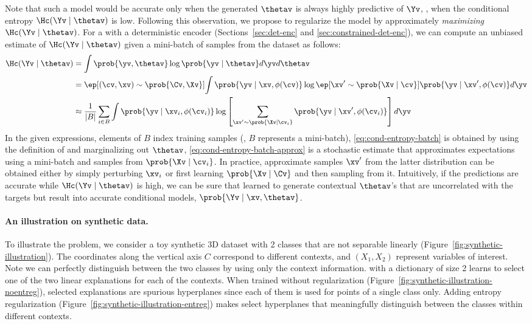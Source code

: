 \documentclass[twoside,11pt]{article}
\begin{document}
Note that such a model would be accurate only when the generated $\thetav$ is always highly predictive of $\Yv$, \ie, when the conditional entropy $\Hc(\Yv \mid \thetav)$ is low.
Following this observation, we propose to regularize the model by approximately \emph{maximizing} $\Hc(\Yv \mid \thetav)$.
For a {\CEN} with a deterministic encoder (Sections~\ref{sec:det-enc} and \ref{sec:constrained-det-enc}), we can compute an unbiased estimate of $\Hc(\Yv \mid \thetav)$ given a mini-batch of samples from the dataset as follows:
\begin{align}
    \label{eq:cond-ent-reg}
    \Hc(\Yv \mid \thetav)
    & = \int \prob{\yv, \thetav} \log \prob{\yv \mid \thetav} d\yv d\thetav \\
    & = \ep[(\cv, \xv) \sim \prob{\Cv, \Xv}]{\int \prob{\yv \mid \xv, \phi(\cv)} \log \ep[\xv^\prime \sim \prob{\Xv \mid \cv}]{\prob{\yv \mid \xv^\prime, \phi(\cv)}} d\yv} \label{eq:cond-entropy-batch} \\
    & \approx \frac{1}{|B|} \sum_{i \in B} \int \prob{\yv \mid \xv_i, \phi(\cv_i)} \log \left[\sum_{\xv^\prime \sim \prob{\Xv \mid \cv_i}} \prob{\yv \mid \xv^\prime, \phi(\cv_i)}\right] d\yv \label{eq:cond-entropy-batch-approx}
\end{align}
In the given expressions, elements of $B$ index training samples (\eg, $B$ represents a mini-batch), \eqref{eq:cond-entropy-batch} is obtained by using the definition of {\CEN} and marginalizing out $\thetav$, \eqref{eq:cond-entropy-batch-approx} is a stochastic estimate that approximates expectations using a mini-batch and samples from $\prob{\Xv \mid \cv_i}$.
In practice, approximate samples $\xv^\prime$ from the latter distribution can be obtained either by simply perturbing $\xv_i$ or first learning $\prob{\Xv \mid \Cv}$ and then sampling from it.
Intuitively, if the predictions are accurate while $\Hc(\Yv \mid \thetav)$ is high, we can be sure that {\CEN} learned to generate contextual $\thetav$'s that are uncorrelated with the targets but result into accurate conditional models, $\prob{\Yv \mid \xv, \thetav}$.

\vspace{-0.5ex}
\paragraph{An illustration on synthetic data.}
To illustrate the problem, we consider a toy synthetic 3D dataset with 2 classes that are not separable linearly (Figure~\ref{fig:synthetic-illustration}).
The coordinates along the vertical axis $C$ correspond to different contexts, and $(X_1, X_2)$ represent variables of interest.
Note we can perfectly distinguish between the two classes by using only the context information.
{\CEN} with a dictionary of size 2 learns to select one of the two linear explanations for each of the contexts.
When trained without regularization (Figure~\ref{fig:synthetic-illustration-noentreg}), selected explanations are spurious hyperplanes since each of them is used for points of a single class only.
Adding entropy regularization (Figure~\ref{fig:synthetic-illustration-entreg}) makes {\CEN} select hyperplanes that meaningfully distinguish between the classes within different contexts.
\end{document}
